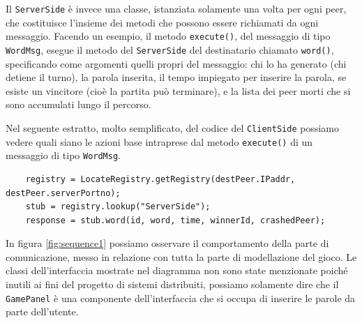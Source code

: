 \documentclass[10.5pt]{article}
\begin{document}
Il \texttt{ServerSide} è invece una classe, istanziata solamente una volta per ogni peer, che costituisce l'insieme dei metodi che possono essere richiamati da ogni messaggio. Facendo un esempio, il metodo \texttt{execute()}, del messaggio di tipo \texttt{WordMsg}, esegue il metodo del \texttt{ServerSide} del destinatario chiamato \texttt{word()}, specificando come argomenti quelli propri del messaggio: chi lo ha generato (chi detiene il turno), la parola inserita, il tempo impiegato per inserire la parola, se esiste un vincitore (cioè la partita può terminare), e la lista dei peer morti che si sono accumulati lungo il percorso.

Nel seguente estratto, molto semplificato, del codice del \texttt{ClientSide} possiamo vedere quali siano le azioni base intraprese dal metodo \texttt{execute()} di un messaggio di tipo \texttt{WordMsg}.
\begin{verbatim}
	registry = LocateRegistry.getRegistry(destPeer.IPaddr, destPeer.serverPortno);
	stub = registry.lookup("ServerSide");
	response = stub.word(id, word, time, winnerId, crashedPeer);
\end{verbatim}

In figura \ref{fig:sequence1} possiamo osservare il comportamento della parte di comunicazione, messo in relazione con tutta la parte di modellazione del gioco. Le classi dell'interfaccia mostrate nel diagramma non sono state menzionate poiché inutili ai fini del progetto di sistemi distribuiti, possiamo solamente dire che il \texttt{GamePanel} è una componente dell'interfaccia che si occupa di inserire le parole da parte dell'utente.
\end{document}
